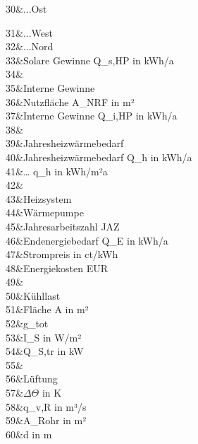 {\begin{Listing}[title={\EnergyWordCsvRows},break=false]
\begin{EnergyCsvRows}
30&...Ost\\
\end{EnergyCsvRows}\hfill
\begin{EnergyCsvRows}
31&...West\\
32&...Nord\\
33&Solare Gewinne Q\_s,HP in kWh/a\\
34&\\
35&Interne Gewinne\\
36&Nutzfläche A\_NRF in m²\\
37&Interne Gewinne Q\_i,HP in kWh/a\\
38&\\
39&Jahresheizwärmebedarf\\
40&Jahresheizwärmebedarf Q\_h in kWh/a\\
41&\ldots{} q\_h in kWh/m²a\\
42&\\
43&Heizsystem\\
44&Wärmepumpe\\
45&Jahresarbeitszahl JAZ\\
46&Endenergiebedarf Q\_E in kWh/a\\
47&Strompreis in ct/kWh\\
48&Energiekosten EUR\\
49&\\
50&Kühllast\\
51&Fläche A in m²\\
52&g\_tot\\
53&I\_S in W/m²\\
54&Q\textquotesingle{}\_S,tr in kW\\
55&\\
56&Lüftung\\
57&$\Delta\Theta$ in K\\
58&q\_v,R in m³/s\\
59&A\_Rohr in m²\\
60&d in m\\
\end{EnergyCsvRows}
\end{Listing}}
